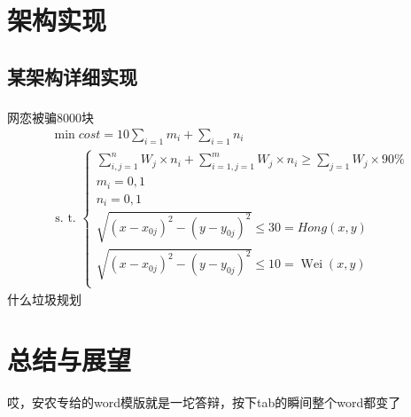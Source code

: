 \documentclass[UTF8,a4paper,12pt]{ctexart}
\begin{document}
	\section{架构实现}
	\subsection{某架构详细实现}
	网恋被骗8000块\textsuperscript{\cite{Ref2}}
	\begin{equation}
		\begin{array}{c}
			\min cost  =10 \sum_{i=1} m_{i}+\sum_{i=1} n_{i}  \\
			\text { s. t. }\left\{\begin{array}{l}
				\sum_{i, j=1}^{n} W_{j} \times n_{i}+\sum_{i=1, j=1}^{m} W_{j} \times n_{i} \geq  \sum_{j=1}^{} W_{j} \times 90\% \\
				m_{i}=0,1  \\ 
				n_{i}=0,1  \\
				\sqrt{\left(x-x_{0j}\right)^{2}-\left(y-y_{0j}\right)^{2}} \leq 30=H o n g(x, y) \\
				\sqrt{\left(x-x_{0j}\right)^{2}-\left(y-y_{0j}\right)^{2}} \leq 10=\operatorname{Wei}(x, y)\\
			\end{array}\right.
		\end{array}
	\end{equation}
	什么垃圾规划

	\section{总结与展望}
	哎，安农专给的word模版就是一坨答辩，按下tab的瞬间整个word都变了
	
\end{document}
